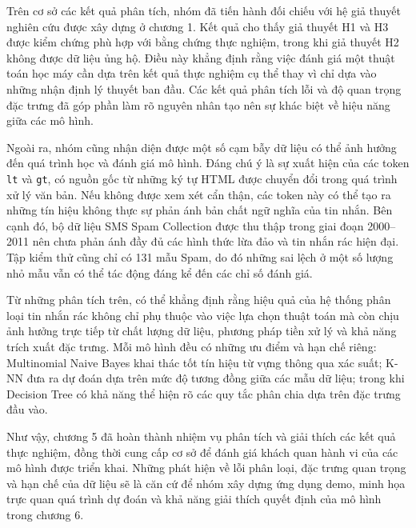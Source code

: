 Trên cơ sở các kết quả phân tích, nhóm đã tiến hành đối chiếu với hệ giả thuyết nghiên cứu được xây dựng ở chương 1. Kết quả cho thấy giả thuyết H1 và H3 được kiểm chứng phù hợp với bằng chứng thực nghiệm, trong khi giả thuyết H2 không được dữ liệu ủng hộ. Điều này khẳng định rằng việc đánh giá một thuật toán học máy cần dựa trên kết quả thực nghiệm cụ thể thay vì chỉ dựa vào những nhận định lý thuyết ban đầu. Các kết quả phân tích lỗi và độ quan trọng đặc trưng đã góp phần làm rõ nguyên nhân tạo nên sự khác biệt về hiệu năng giữa các mô hình.

Ngoài ra, nhóm cũng nhận diện được một số cạm bẫy dữ liệu có thể ảnh hưởng đến quá trình học và đánh giá mô hình. Đáng chú ý là sự xuất hiện của các token \texttt{lt} và \texttt{gt}, có nguồn gốc từ những ký tự HTML được chuyển đổi trong quá trình xử lý văn bản. Nếu không được xem xét cẩn thận, các token này có thể tạo ra những tín hiệu không thực sự phản ánh bản chất ngữ nghĩa của tin nhắn. Bên cạnh đó, bộ dữ liệu SMS Spam Collection được thu thập trong giai đoạn 2000--2011 nên chưa phản ánh đầy đủ các hình thức lừa đảo và tin nhắn rác hiện đại. Tập kiểm thử cũng chỉ có 131 mẫu Spam, do đó những sai lệch ở một số lượng nhỏ mẫu vẫn có thể tác động đáng kể đến các chỉ số đánh giá.

Từ những phân tích trên, có thể khẳng định rằng hiệu quả của hệ thống phân loại tin nhắn rác không chỉ phụ thuộc vào việc lựa chọn thuật toán mà còn chịu ảnh hưởng trực tiếp từ chất lượng dữ liệu, phương pháp tiền xử lý và khả năng trích xuất đặc trưng. Mỗi mô hình đều có những ưu điểm và hạn chế riêng: Multinomial Naive Bayes khai thác tốt tín hiệu từ vựng thông qua xác suất; K-NN đưa ra dự đoán dựa trên mức độ tương đồng giữa các mẫu dữ liệu; trong khi Decision Tree có khả năng thể hiện rõ các quy tắc phân chia dựa trên đặc trưng đầu vào.

Như vậy, chương 5 đã hoàn thành nhiệm vụ phân tích và giải thích các kết quả thực nghiệm, đồng thời cung cấp cơ sở để đánh giá khách quan hành vi của các mô hình được triển khai. Những phát hiện về lỗi phân loại, đặc trưng quan trọng và hạn chế của dữ liệu sẽ là căn cứ để nhóm xây dựng ứng dụng demo, minh họa trực quan quá trình dự đoán và khả năng giải thích quyết định của mô hình trong chương 6.